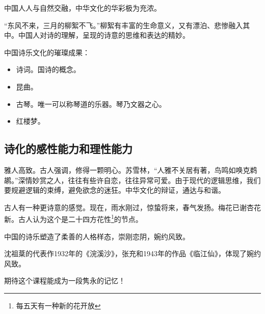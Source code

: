 \documentclass[blue,iPad,cn]{elegantnote}
\begin{document}
中国人人与自然交融，中华文化的华彩极为充浓。

“东风不来，三月的柳絮不飞。”柳絮有丰富的生命意义，又有漂泊、悲惨融入其中。中国人对诗的理解，呈现的诗意的思维和表达的精妙。

中国诗乐文化的璀璨成果：

\begin{itemize}
	\item 诗词。国诗的概念。
	\item 昆曲。
	\item 古琴。唯一可以称琴道的乐器。琴乃文器之心。
	\item 红楼梦。
\end{itemize}

\subsection{诗化的感性能力和理性能力}

雅人高致。古人强调，修得一颗明心。苏雪林，“人雅不关居有著，鸟鸣如唤克鹈鹕。”深情妙赏之人，往往有些许自恋，往往异常可爱。由于现代的逻辑思维，我们要规避逻辑的束缚，避免欲念的迷狂。中华文化的辩证，通达与和谐。

古人有一种更诗意的感觉。现在，雨水刚过，惊蛰将来，春气发扬。梅花已谢杏花新。古人认为这个是二十四方花性\footnote{每五天有一种新的花开放}的节点。

中国的诗乐塑造了柔善的人格样态，崇刚恋阴，婉约风致。

\begin{example}
	沈祖棻的代表作1932年的《浣溪沙》，张充和1943年的作品《临江仙》，体现了婉约风致。
\end{example}

期待这个课程能成为一段隽永的记忆！
\end{document}
